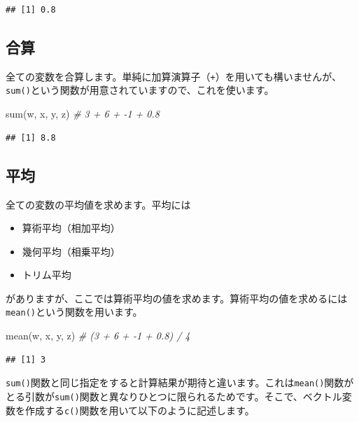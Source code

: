 \documentclass[
  12pt,
]{book}
\newenvironment{Shaded}{\begin{snugshade}}{\end{snugshade}}
\newcommand{\CommentTok}[1]{\textcolor[rgb]{0.56,0.35,0.01}{\textit{#1}}}
\newcommand{\FunctionTok}[1]{\textcolor[rgb]{0.00,0.00,0.00}{#1}}
\newcommand{\NormalTok}[1]{#1}
\providecommand{\tightlist}{%
  \setlength{\itemsep}{0pt}\setlength{\parskip}{0pt}}
\begin{document}
\begin{verbatim}
## [1] 0.8
\end{verbatim}

\hypertarget{ux5408ux7b97}{%
\subsection{合算}\label{ux5408ux7b97}}

全ての変数を合算します。単純に加算演算子（\texttt{+}）を用いても構いませんが、\texttt{sum()}という関数が用意されていますので、これを使います。

\begin{Shaded}
\begin{Highlighting}[numbers=left,,]
\FunctionTok{sum}\NormalTok{(w, x, y, z)    }\CommentTok{\# 3 + 6 + {-}1 + 0.8}
\end{Highlighting}
\end{Shaded}

\begin{verbatim}
## [1] 8.8
\end{verbatim}

\hypertarget{ux5e73ux5747-1}{%
\subsection{平均}\label{ux5e73ux5747-1}}

全ての変数の平均値を求めます。平均には

\begin{itemize}
\tightlist
\item
  算術平均（相加平均）
\item
  幾何平均（相乗平均）
\item
  トリム平均
\end{itemize}

がありますが、ここでは算術平均の値を求めます。算術平均の値を求めるには\texttt{mean()}という関数を用います。

\begin{Shaded}
\begin{Highlighting}[numbers=left,,]
\FunctionTok{mean}\NormalTok{(w, x, y, z)   }\CommentTok{\# (3 + 6 + {-}1 + 0.8) / 4}
\end{Highlighting}
\end{Shaded}

\begin{verbatim}
## [1] 3
\end{verbatim}

\texttt{sum()}関数と同じ指定をすると計算結果が期待と違います。これは\texttt{mean()}関数がとる引数が\texttt{sum()}関数と異なりひとつに限られるためです。そこで、ベクトル変数を作成する\texttt{c()}関数を用いて以下のように記述します。
\end{document}

